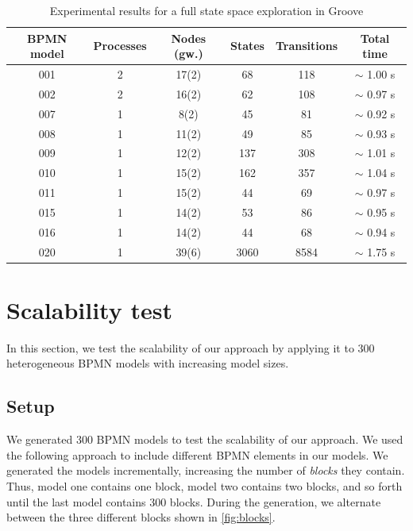 \documentclass{lmcs} %
\begin{document}
\begin{table}[ht]
\centering
\caption{Experimental results for a full state space exploration in Groove}

\begin{tabular}{| c | c | c || c | c | c |}
 \hline
 BPMN model & Processes & Nodes (gw.) & States & Transitions & Total time \\
 \hline\hline
 001 & 2 & 17(2) & 68 & 118 & $\sim$ 1.00 s \\
 \hline
 002 & 2 & 16(2) & 62 & 108 & $\sim$ 0.97 s \\
 \hline
 007 & 1 & 8(2) & 45 & 81 & $\sim$ 0.92 s \\
 \hline
 008 & 1 & 11(2) & 49 & 85 & $\sim$ 0.93 s \\
 \hline
 009 & 1 & 12(2) & 137 & 308 & $\sim$ 1.01 s \\
 \hline
 010 & 1 & 15(2) & 162 & 357 & $\sim$ 1.04 s \\
 \hline
 011 & 1 & 15(2) & 44 & 69 & $\sim$ 0.97 s \\
 \hline
 015 & 1 & 14(2) & 53 & 86 & $\sim$ 0.95 s \\
 \hline
 016 & 1 & 14(2) & 44 & 68 & $\sim$ 0.94 s \\
 \hline
 020 & 1 & 39(6) & 3060 & 8584 & $\sim$ 1.75 s \\
 \hline
\end{tabular}
\label{table:stateSpaceBenchmark}
\end{table}

\section{Scalability test} \label{sec:scalability}

In this section, we test the scalability of our approach by applying it to 300 heterogeneous BPMN models with increasing model sizes. 

\subsection{Setup}

We generated 300 BPMN models to test the scalability of our approach.
We used the following approach to include different BPMN elements in our models.
We generated the models incrementally, increasing the number of \textit{blocks} they contain.
Thus, model one contains one block, model two contains two blocks, and so forth until the last model contains 300 blocks.
During the generation, we alternate between the three different blocks shown in \autoref{fig:blocks}.
\end{document}
